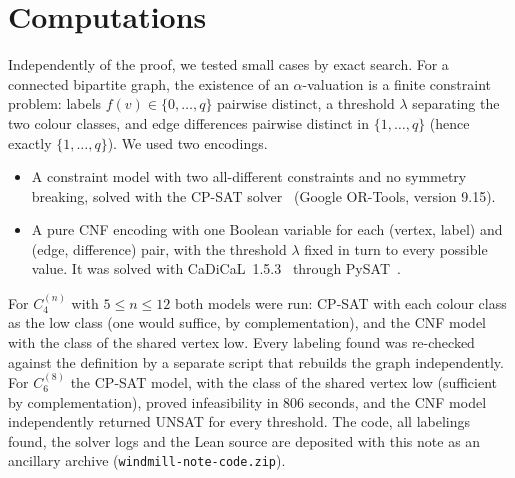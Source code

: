 \documentclass[11pt]{amsart}
\theoremstyle{definition}
\theoremstyle{remark}
\begin{document}
\section{Computations}\label{sec:computation}

Independently of the proof, we tested small cases by exact search. For a connected bipartite graph, the existence of an $\alpha$-valuation is a finite constraint problem: labels $f(v) \in \{0,\dots,q\}$ pairwise distinct, a threshold $\lambda$ separating the two colour classes, and edge differences pairwise distinct in $\{1,\dots,q\}$ (hence exactly $\{1,\dots,q\}$). We used two encodings.
\begin{itemize}
\item A constraint model with two all-different constraints and no symmetry breaking, solved with the CP-SAT solver~\cite{ortools} (Google OR-Tools, version 9.15).
\item A pure CNF encoding with one Boolean variable for each (vertex, label) and (edge, difference) pair, with the threshold $\lambda$ fixed in turn to every possible value. It was solved with CaDiCaL~1.5.3~\cite{cadical} through PySAT~\cite{pysat}.
\end{itemize}
For $C_4^{(n)}$ with $5 \le n \le 12$ both models were run: CP-SAT with each colour class as the low class (one would suffice, by complementation), and the CNF model with the class of the shared vertex low. Every labeling found was re-checked against the definition by a separate script that rebuilds the graph independently. For $C_6^{(8)}$ the CP-SAT model, with the class of the shared vertex low (sufficient by complementation), proved infeasibility in 806 seconds, and the CNF model independently returned UNSAT for every threshold. The code, all labelings found, the solver logs and the Lean source are deposited with this note as an ancillary archive (\texttt{windmill-note-code.zip}).
\end{document}
